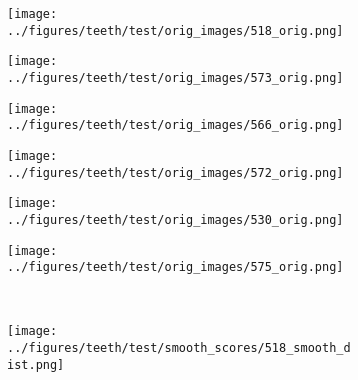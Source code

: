 \begin{figure}[h!]
	\begin{subfigure}[b]{0.03\textwidth} %
		\centering
	\end{subfigure}
	\hspace{0.2cm}
	\begin{subfigure}{0.15\textwidth}
			\centering
			\texttt{[image: ../figures/teeth/test/orig\_images/518\_orig.png]}
			\label{fig:1}
		\end{subfigure}
	\begin{subfigure}{0.15\textwidth}
			\centering
			\texttt{[image: ../figures/teeth/test/orig\_images/573\_orig.png]}
			\label{fig:1}
		\end{subfigure}
	\begin{subfigure}{0.15\textwidth}
			\centering
			\texttt{[image: ../figures/teeth/test/orig\_images/566\_orig.png]}
			\label{fig:1}
		\end{subfigure}
	\begin{subfigure}{0.15\textwidth}
			\centering
			\texttt{[image: ../figures/teeth/test/orig\_images/572\_orig.png]}
			\label{fig:1}
		\end{subfigure}
	\begin{subfigure}{0.15\textwidth}
			\centering
			\texttt{[image: ../figures/teeth/test/orig\_images/530\_orig.png]}
			\label{fig:1}
		\end{subfigure}
	\begin{subfigure}{0.15\textwidth}
			\centering
			\texttt{[image: ../figures/teeth/test/orig\_images/575\_orig.png]}
			\label{fig:1}
		\end{subfigure}
	\vspace{-0.35cm}
	\\
	\begin{subfigure}[b]{0.03\textwidth} %
		\centering
	\end{subfigure}
	\hspace{0.2cm}
	\begin{subfigure}{0.15\textwidth}
			\centering
			\texttt{[image: ../figures/teeth/test/smooth\_scores/518\_smooth\_dist.png]}
			\label{fig:1}

\end{subfigure}
\end{figure}
